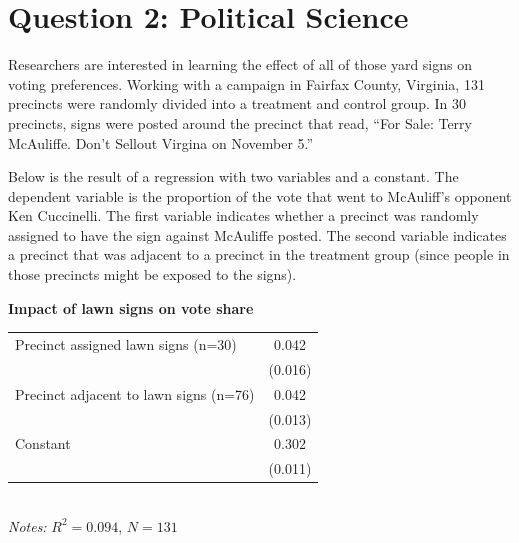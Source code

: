 \documentclass[12pt,letterpaper]{article}
\begin{document}
\section{Question 2: Political Science}
\noindent Researchers are interested in learning the effect of all of those yard signs on voting preferences. Working with a campaign in Fairfax County, Virginia, 131 precincts were randomly divided into a treatment and control group. In 30 precincts, signs were posted around the precinct that read, ``For Sale: Terry McAuliffe. Don't Sellout Virgina on November 5.''

\medskip
\noindent Below is the result of a regression with two variables and a constant. The dependent variable is the proportion of the vote that went to McAuliff's opponent Ken Cuccinelli. The first variable indicates whether a precinct was randomly assigned to have the sign against McAuliffe posted. The second variable indicates a precinct that was adjacent to a precinct in the treatment group (since people in those precincts might be exposed to the signs).

\begin{center}
\textbf{Impact of lawn signs on vote share}\\[3pt]
{\renewcommand{\arraystretch}{0.94}%
\begin{tabular}{lc}
\hline
Precinct assigned lawn signs (n=30)    & 0.042 \\
                                      & (0.016) \\
Precinct adjacent to lawn signs (n=76) & 0.042 \\
                                      & (0.013) \\
Constant                              & 0.302 \\
                                      & (0.011) \\
\hline
\end{tabular}}\\[2pt]
{\textit{Notes:} $R^2=0.094$, $N=131$}
\end{center}
\end{document}

